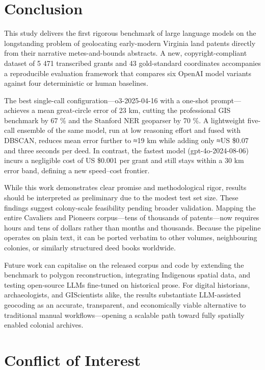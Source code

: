 \section{Conclusion}\label{conclusion}

This study delivers the first rigorous benchmark of large language
models on the longstanding problem of geolocating early-modern Virginia
land patents directly from their narrative metes-and-bounds abstracts. A
new, copyright-compliant dataset of 5 471 transcribed grants and 43
gold-standard coordinates accompanies a reproducible evaluation
framework that compares six OpenAI model variants against four
deterministic or human baselines.

The best single-call configuration---o3-2025-04-16 with a one-shot
prompt---achieves a mean great-circle error of 23 km, cutting the
professional GIS benchmark by 67 \% and the Stanford NER geoparser by 70
\%. A lightweight five-call ensemble of the same model, run at low
reasoning effort and fused with DBSCAN, reduces mean error further to
≈19 km while adding only ≈US \$0.07 and three seconds per deed. In
contrast, the fastest model (gpt-4o-2024-08-06) incurs a negligible cost
of US \$0.001 per grant and still stays within a 30 km error band,
defining a new speed--cost frontier.

While this work demonstrates clear promise and methodological rigor,
results should be interpreted as preliminary due to the modest test set
size. These findings suggest colony-scale feasibility pending broader
validation. Mapping the entire Cavaliers and Pioneers corpus---tens of
thousands of patents---now requires hours and tens of dollars rather
than months and thousands. Because the pipeline operates on plain text,
it can be ported verbatim to other volumes, neighbouring colonies, or
similarly structured deed books worldwide.

Future work can capitalise on the released corpus and code by extending
the benchmark to polygon reconstruction, integrating Indigenous spatial
data, and testing open-source LLMs fine-tuned on historical prose. For
digital historians, archaeologists, and GIScientists alike, the results
substantiate LLM-assisted geocoding as an accurate, transparent, and
economically viable alternative to traditional manual
workflows---opening a scalable path toward fully spatially enabled
colonial archives.

\section{Conflict of Interest}\label{conflict-of-interest}

